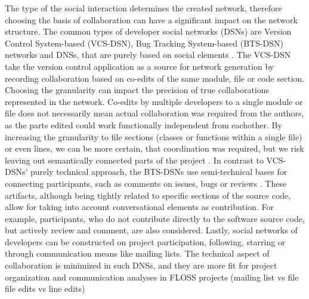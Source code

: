 The type of the social interaction determines the created network, therefore choosing the basis of collaboration can have a significant impact on the network structure. The common types of developer social networks (DSNs) are Version Control System-based (VCS-DSN), Bug Tracking System-based (BTS-DSN) networks and DNSs, that are purely based on social elements \cite{aljemabiEmpiricalStudyEvolution2018}. The VCS-DSN take the version control application as a source for network generation by recording collaboration based on co-edits of the same module, file or code section. Choosing the granularity can impact the precision of true collaborations represented in the network. Co-edits by multiple developers to a single module or file does not necessarily mean actual collaboration was required from the authors, as the parts edited could work functionally independent from eachother. By increasing the granularity to file sections (classes or functions within a single file) or even lines, we can be more certain, that coordination was required, but we risk leaving out semantically connected parts of the project \cite{joblinEvolutionaryTrendsDeveloper2017}. In contrast to VCS-DSNs' purely technical approach, the BTS-DSNs use semi-technical bases for connecting participants, such as comments on issues, bugs or reviews \cite{elasriPeripheryCoreTemporal2017}. These artifacts, although being tightly related to specific sections of the source code, allow for taking into account conversational elements as contribution. For example, participants, who do not contribute directly to the software source code, but actively review and comment, are also considered. Lastly, social networks of developers can be constructed on project participation, following, starring or through communication means like mailing lists. The technical aspect of collaboration is minimized in such DNSs, and they are more fit for project organization and communication analyses in FLOSS projects (mailing list vs file file edits vs line edits) \\





